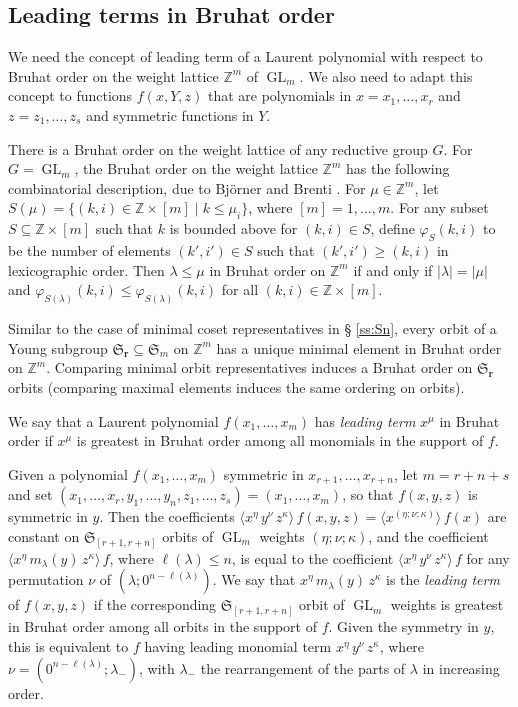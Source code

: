 \documentclass[12pt]{amsart}
\theoremstyle{definition}
\theoremstyle{remark}
\newcommand{\ZZ}{{\mathbb Z}}
\newcommand{\rr}{{\mathbf r}}
\newcommand{\Sfrak}{{\mathfrak S}}
\DeclareMathOperator{\GL}{GL}
\begin{document}
\subsection{Leading terms in Bruhat order}
\label{ss:Bruhat}

We need the concept of leading term of a Laurent polynomial with
respect to Bruhat order on the weight lattice $\ZZ ^{m}$ of $\GL
_{m}$.  We also need to adapt this concept to functions $f(x,Y,z)$
that are polynomials in $x = x_{1}, \ldots,x_{r}$ and
$z=z_{1},\ldots,z_{s}$ and symmetric functions in $Y$.

There is a Bruhat order on the weight lattice of any reductive group
$G$.  For $G = \GL _{m}$, the Bruhat order on the weight lattice $\ZZ
^{m}$ has the following combinatorial description, due to Bj\"orner
and Brenti \cite[Theorem~6.2]{BjorBren96}.  For $\mu \in \ZZ ^{m}$,
let $S(\mu ) = \{(k,i)\in \ZZ \times [m] \mid k \leq \mu _{i} \}$,
where $[m] = {1,\ldots,m}$.  For any subset $S\subseteq \ZZ \times
[m]$ such that $k$ is bounded above for $(k,i)\in S$, define $\varphi
_{S}(k,i)$ to be the number of elements $(k',i')\in S$ such that
$(k',i')\geq (k,i)$ in lexicographic order.  Then $\lambda \leq \mu $
in Bruhat order on $\ZZ ^{m}$ if and only if $|\lambda |= |\mu |$ and
$\varphi _{S(\lambda )}(k,i)\leq \varphi _{S(\lambda )}(k,i)$ for all
$(k,i)\in \ZZ \times [m]$.

Similar to the case of minimal coset representatives in \S
\ref{ss:Sn}, every orbit of a Young subgroup $\Sfrak _{\rr }\subseteq
\Sfrak _{m}$ on $\ZZ ^{m}$ has a unique minimal element in Bruhat
order on $\ZZ ^{m}$.  Comparing minimal orbit representatives induces
a Bruhat order on $\Sfrak _{\rr }$ orbits (comparing maximal elements
induces the same ordering on orbits).

We say that a Laurent polynomial $f(x_{1},\ldots,x_{m})$ has {\em
leading term} $x^{\mu }$ in Bruhat order if $x^{\mu }$ is greatest in
Bruhat order among all monomials in the support of $f$.

Given a polynomial $f(x_{1},\ldots,x_{m})$ symmetric in
$x_{r+1},\ldots,x_{r+n}$, let $m = r+n+s$ and set $(x_{1}, \ldots,
x_{r}, y_{1}, \ldots, y_{n}, z_{1}, \ldots, z_{s}) =
(x_{1},\ldots,x_{m})$, so that $f(x,y,z)$ is symmetric in $y$.  Then
the coefficients $\langle x^{\eta } \, y^{\nu }\, z^{\kappa } \rangle
\, f(x,y,z) = \langle x^{(\eta ;\nu ;\kappa )} \rangle\, f(x)$ are
constant on $\Sfrak _{[r+1,r+n]}$ orbits of $\GL _{m}$ weights $(\eta
;\nu ;\kappa )$, and the coefficient $\langle x^{\eta }\, m_{\lambda
}(y)\, z^{\kappa } \rangle\, f$, where $\ell (\lambda )\leq n$, is
equal to the coefficient $\langle x^{\eta } \, y^{\nu }\, z^{\kappa }
\rangle \, f$ for any permutation $\nu $ of $(\lambda ;0^{n-\ell
(\lambda )})$.  We say that $x^{\eta }\, m_{\lambda }(y)\, z^{\kappa
}$ is the {\em leading term} of $f(x,y,z)$ if the corresponding
$\Sfrak _{[r+1,r+n]}$ orbit of $\GL _{m}$ weights is greatest in
Bruhat order among all orbits in the support of $f$.  Given the
symmetry in $y$, this is equivalent to $f$ having leading monomial
term $x^{\eta } \, y^{ \nu }\, z^{\kappa }$, where $\nu =(0^{n-\ell
(\lambda )}; \lambda _{-})$, with $\lambda _{-}$ the rearrangement of
the parts of $\lambda $ in increasing order.
\end{document}
